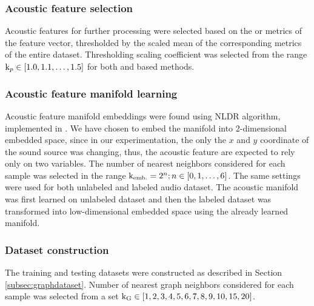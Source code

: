\documentclass[applsci,article,submit,moreauthors,pdftex]{Definitions/mdpi}
\begin{document}
\subsubsection{Acoustic feature selection}
Acoustic features for further processing were selected based on the \rms{} or \cf{} metrics of the feature vector, thresholded by the scaled mean of the corresponding metrics of the entire dataset.
Thresholding scaling coefficient \thrmeanlvl{} was selected from the range $ \mathrm{k}_{p} \in [1.0, 1.1, \dots, 1.5] $ for both \rms{} and \cf{} based methods.

\subsubsection{Acoustic feature manifold learning}
Acoustic feature manifold embeddings were found using \isomap{} NLDR algorithm, implemented in \cite{pedregosaScikitlearnMachineLearning2011}.
We have chosen to embed the manifold into 2-dimensional embedded space, since in our experimentation, the only the $ x $ and $ y $ coordinate of the sound source was changing, thus, the acoustic feature are expected to rely only on two variables.
The number of nearest neighbors considered for each sample was selected in the range $ \mathrm{k}_{\mathrm{emb.}} = 2^n; n \in [0,1,\dots,6] $.
The same settings were used for both unlabeled and labeled audio dataset. The acoustic manifold was first learned on unlabeled dataset and then the labeled dataset was transformed into low-dimensional embedded space using the already learned manifold.


\subsubsection{Dataset construction}
The training and testing datasets were constructed as described in Section \ref{subsec:graphdataset}. Number of nearest graph neighbors considered for each sample \gnbrs{} was selected from a set $ \mathrm{k}_{\mathrm{G}}{} \in [1, 2, 3, 4, 5, 6, 7, 8, 9, 10, 15, 20] $. 

\end{document}
